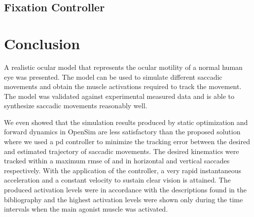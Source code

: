 \documentclass[11pt,a4paper,draft=false]{report}
\begin{document}
\subsection*{Fixation Controller}\label{sec:fixation-controller}


\section*{Conclusion}\label{sec:conclusion}

A realistic ocular model that represents the ocular motility of a normal human
eye was presented. The model can be used to simulate different saccadic
movements and obtain the muscle activations required to track the movement. The
model was validated against experimental measured data and is able to synthesize
saccadic movements reasonably well.

We even showed that the simulation results produced by static optimization and
forward dynamics in OpenSim are less satisfactory than the proposed solution
where we used a \gls{pd} controller to minimize the tracking error between the
desired and estimated trajectory of saccadic movements. The desired kinematics
were tracked within a maximum \gls{rmse} of and in horizontal and vertical
saccades respectively. With the application of the controller, a very rapid
instantaneous acceleration and a constant velocity to sustain clear vision is
attained. The produced activation levels were in accordance with the
descriptions found in the bibliography and the highest activation levels were
shown only during the time intervals when the main agonist muscle was activated.




\end{document}

